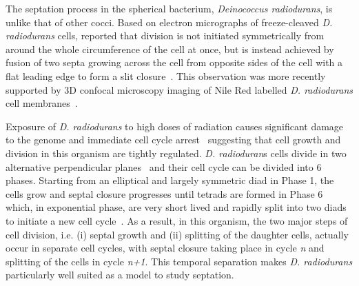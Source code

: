 The septation process in the spherical bacterium, \textit{Deinococcus radiodurans}, is unlike that of other cocci.
Based on electron micrographs of freeze-cleaved \textit{D. radiodurans} cells, \citet{murrayCellDivisionDeinococcus1983} reported that division is not initiated symmetrically from around the whole circumference of the cell at once, but is instead achieved by fusion of two septa growing across the cell from opposite sides of the cell with a flat leading edge to form a slit closure~\cite{murrayCellDivisionDeinococcus1983}.
This observation was more recently supported by 3D confocal microscopy imaging of Nile Red labelled \textit{D. radiodurans} cell membranes~\cite{flochCellMorphologyNucleoid2019}.

Exposure of \textit{D. radiodurans} to high doses of radiation causes significant damage to the genome and immediate cell cycle arrest~\cite{zahradkaReassemblyShatteredChromosomes2006} suggesting that cell growth and division in this organism are tightly regulated.
\textit{D. radioduran}s cells divide in two alternative perpendicular planes~\cite{murrayCellDivisionDeinococcus1983,thornleyFineStructureMicrococcus1965} and their cell cycle can be divided into 6 phases.
Starting from an elliptical and largely symmetric diad in Phase 1, the cells grow and septal closure progresses until tetrads are formed in Phase 6 which, in exponential phase, are very short lived and rapidly split into two diads to initiate a new cell cycle~\cite{flochCellMorphologyNucleoid2019}.
As a result, in this organism, the two major steps of cell division, i.e. (i) septal growth and (ii) splitting of the daughter cells, actually occur in separate cell cycles, with septal closure taking place in cycle \textit{n} and splitting of the cells in cycle \textit{n+1}. This temporal separation makes \textit{D. radiodurans} particularly well suited as a model to study septation.

